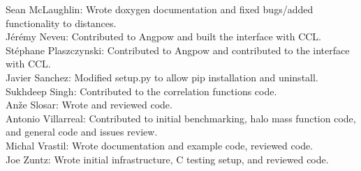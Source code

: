 Sean McLaughlin: Wrote doxygen documentation and fixed bugs/added functionality to distances. \\
J\'er\'emy Neveu: Contributed to Angpow and built the interface with CCL. \\
St\'ephane Plaszczynski: Contributed to Angpow and contributed to the interface with CCL. \\
Javier Sanchez: Modified setup.py to allow pip installation and uninstall. \\
Sukhdeep Singh: Contributed to the correlation functions code. \\
An\v{z}e Slosar: Wrote and reviewed code. \\
Antonio Villarreal: Contributed to initial benchmarking, halo mass function code, and general code and issues review. \\
Michal Vrastil: Wrote documentation and example code, reviewed code. \\
Joe Zuntz: Wrote initial infrastructure, C testing setup, and reviewed code. \\
